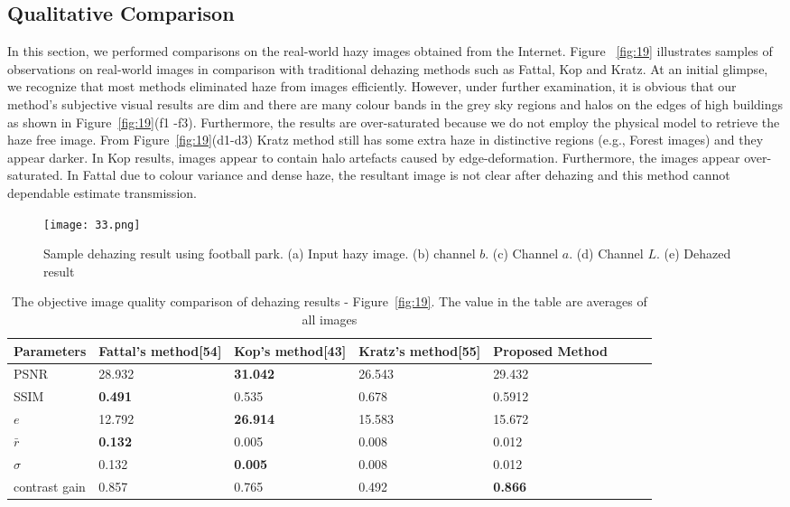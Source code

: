 \documentclass[doctor,english,listoffigures,listoftables]{thesis-uestc}
\begin{document}
\subsection{Qualitative Comparison}
In this section, we performed comparisons on the real-world hazy images obtained from the Internet.  Figure ~\ref{fig:19} illustrates samples of observations on real-world images in comparison with traditional  dehazing methods such as Fattal, Kop and Kratz. At an initial glimpse, we recognize that most methods eliminated haze from images efficiently. However, under further examination, it is obvious that our method's subjective visual results are dim and there are many colour bands in the grey sky regions and halos on the edges of high buildings as shown in Figure~\ref{fig:19}(f1 -f3). Furthermore, the results are over-saturated because we do not employ the physical model to retrieve the haze free image. From Figure~\ref{fig:19}(d1-d3) Kratz method still has some extra haze in distinctive regions (e.g., Forest images) and they appear darker. In Kop results, images appear to contain halo artefacts caused by edge-deformation. Furthermore, the images appear over-saturated. In Fattal due to colour variance and dense haze, the resultant image is not clear after dehazing and this method cannot dependable estimate transmission.


\begin{figure*}
	\centering
	\texttt{[image: 33.png]}
	\caption{Sample dehazing result using football park. (a) Input hazy image. (b) channel $b$. (c) Channel $a$. (d) Channel $L$. (e) Dehazed result}
	\label{fig:18}
\end{figure*}

\begin{table}
	\centering
	\caption{The objective image quality comparison of dehazing results - Figure~\ref{fig:19}. The value in the table are averages of all images}
    \begin{tabular}{|p{52pt}|p{58pt}|p{58pt}|p{58pt}|p{58pt}|p{52pt}|p{52pt}|p{52pt}|}
    
	\hline\textbf{Parameters}	& \textbf{Fattal's method[54]}& \textbf{Kop's method[43]} &  \textbf{Kratz's method[55]} &  \textbf{Proposed Method}\\
	\hline
	PSNR&  28.932 & \textbf{31.042} & 26.543 & 29.432\\
		\hline	
	SSIM&\textbf{0.491} & 0.535 & 0.678 & 0.5912\\
		\hline	
	$e$& 12.792 & \textbf{26.914}  & 15.583 & 15.672 \\
     	\hline	
	$\bar r$& \textbf{0.132} & 0.005 & 0.008 & 0.012\\
		\hline	
	$\sigma$& 0.132 & \textbf{0.005} & 0.008& 0.012\\
		\hline	
	contrast gain& 0.857 & 0.765 & 0.492 & \textbf{0.866}\\
	\hline	
\end{tabular}
	\label{Tab7}
\end{table}
\end{document}
